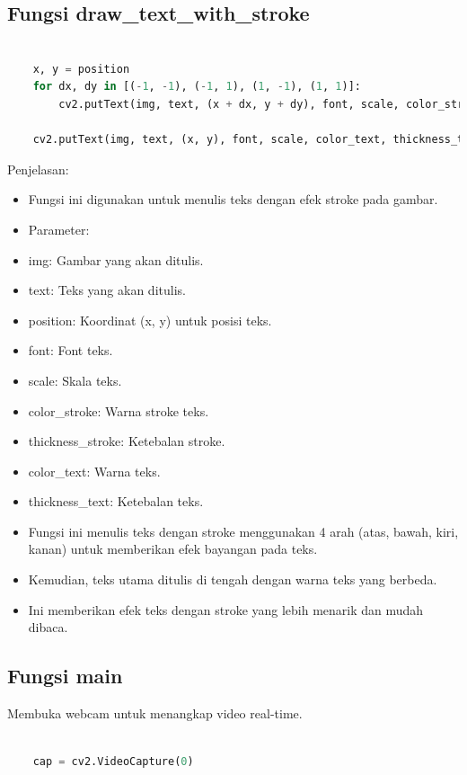 \documentclass[11pt,a4paper]{article}
\begin{document}
    \subsection{Fungsi draw\_text\_with\_stroke}
    \begin{lstlisting}[language=Python, caption=Fungsi Menulis Teks dengan Stroke]

    x, y = position
    for dx, dy in [(-1, -1), (-1, 1), (1, -1), (1, 1)]:
        cv2.putText(img, text, (x + dx, y + dy), font, scale, color_stroke, thickness_stroke)

    cv2.putText(img, text, (x, y), font, scale, color_text, thickness_text)
    \end{lstlisting}
    Penjelasan:
    \begin{itemize}
        \item Fungsi ini digunakan untuk menulis teks dengan efek stroke pada gambar.
        \item Parameter:
            \item img: Gambar yang akan ditulis.
            \item text: Teks yang akan ditulis.
            \item position: Koordinat (x, y) untuk posisi teks.
            \item font: Font teks.
            \item scale: Skala teks.
            \item color\_stroke: Warna stroke teks.
            \item thickness\_stroke: Ketebalan stroke.
            \item color\_text: Warna teks.
            \item thickness\_text: Ketebalan teks.
            \item Fungsi ini menulis teks dengan stroke menggunakan 4 arah (atas, bawah, kiri, kanan) untuk memberikan efek bayangan pada teks. 
            \item Kemudian, teks utama ditulis di tengah dengan warna teks yang berbeda.
            \item Ini memberikan efek teks dengan stroke yang lebih menarik dan mudah dibaca.
    \end{itemize}

    \subsection{Fungsi main}
    
    Membuka webcam untuk menangkap video real-time.
    \begin{lstlisting}[language=Python, caption=Membuka Webcam]
    
    cap = cv2.VideoCapture(0)
    \end{lstlisting}
\end{document}
